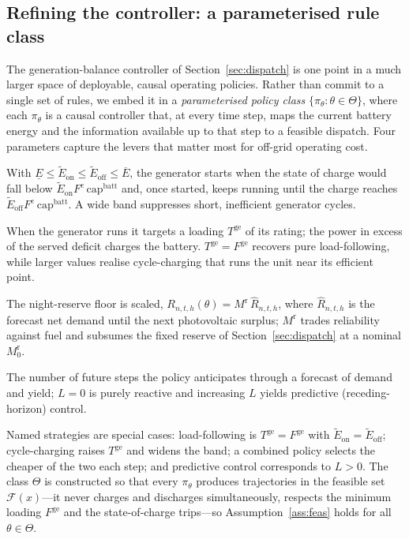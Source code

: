 \documentclass[11pt,a4paper]{article}
\theoremstyle{plain}
\theoremstyle{definition}
\begin{document}
\subsection{Refining the controller: a parameterised rule class}
\label{sec:refine}

The generation-balance controller of Section~\ref{sec:dispatch} is one point in a much
larger space of deployable, causal operating policies. Rather than commit to a single set
of rules, we embed it in a \emph{parameterised policy class}
$\{\pi_\theta : \theta\in\Theta\}$, where each $\pi_\theta$ is a causal controller that,
at every time step, maps the current battery energy and the information available up to
that step to a feasible dispatch. Four parameters capture the levers that matter most for
off-grid operating cost.
\begin{description}[leftmargin=1.9em,style=nextline]
  \item[Commitment hysteresis $(\tilde E_{\mathrm{on}},\tilde E_{\mathrm{off}})$.] With
  $\underline{E}\le\tilde E_{\mathrm{on}}\le\tilde E_{\mathrm{off}}\le\overline E$, the
  generator starts when the state of charge would fall below
  $\tilde E_{\mathrm{on}}F^{e}\,\mathrm{cap}^{\mathrm{batt}}$ and, once started, keeps
  running until the charge reaches $\tilde E_{\mathrm{off}}F^{e}\,\mathrm{cap}^{\mathrm{batt}}$.
  A wide band suppresses short, inefficient generator cycles.
  \item[{Generator setpoint $T^{\mathrm{ge}}\in[F^{\mathrm{ge}},1]$.}] When the
  generator runs it targets a loading $T^{\mathrm{ge}}$ of its rating; the power in
  excess of the served deficit charges the battery. $T^{\mathrm{ge}}=F^{\mathrm{ge}}$
  recovers pure load-following, while larger values realise cycle-charging that runs the
  unit near its efficient point.
  \item[Reserve multiplier $M^{\mathrm{r}}\ge0$.] The night-reserve floor is scaled,
  $R_{n,t,h}(\theta)=M^{\mathrm{r}}\,\hat R_{n,t,h}$, where $\hat R_{n,t,h}$ is the forecast net
  demand until the next photovoltaic surplus; $M^{\mathrm{r}}$ trades reliability against fuel and
  subsumes the fixed reserve of Section~\ref{sec:dispatch} at a nominal $M^{\mathrm{r}}_0$.
  \item[Look-ahead horizon $L\ge0$.] The number of future steps the policy anticipates
  through a forecast of demand and yield; $L=0$ is purely reactive and increasing $L$
  yields predictive (receding-horizon) control.
\end{description}
Named strategies are special cases: load-following is
$T^{\mathrm{ge}}=F^{\mathrm{ge}}$ with $\tilde E_{\mathrm{on}}=\tilde E_{\mathrm{off}}$;
cycle-charging raises $T^{\mathrm{ge}}$ and widens the band; a combined policy selects
the cheaper of the two each step; and predictive control corresponds to $L>0$. The class
$\Theta$ is constructed so that every $\pi_\theta$ produces trajectories in the feasible
set $\mathcal{F}(x)$---it never charges and discharges simultaneously, respects the
minimum loading $F^{\mathrm{ge}}$ and the state-of-charge trips---so
Assumption~\ref{ass:feas} holds for all $\theta\in\Theta$.
\end{document}
